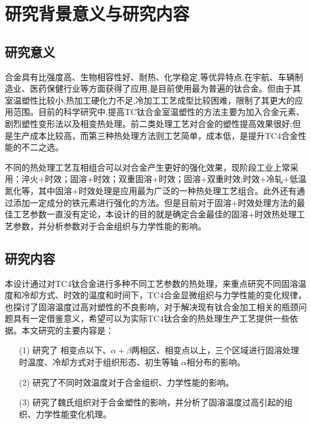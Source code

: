 \section{研究背景意义与研究内容}
\subsection{研究意义}
\ti 合金具有比强度高、生物相容性好、耐热、化学稳定,等优异特点,在宇航、车辆制造业、医药保健行业等方面获得了应用,是目前使用最为普遍的钛合金。但由于其室温塑性比较小,热加工硬化力不足,冷加工工艺成型比较困难，限制了其更大的应用范围。目前的科学研究中,提高TC钛合金室温塑性的方法主要为加入合金元素、剧烈塑性变形法以及相变热处理。前二类处理工艺对合金的塑性提高效果很好,但是生产成本比较高\cite{miao}，而第三种热处理方法则工艺简单，成本低，是提升TC4合金性能的不二之选。

不同的热处理工艺互相组合可以对合金产生更好的强化效果，现阶段工业上常采用\cite{zhoukaixiangJiyushenlengchulidenanjiagongcailiaoqiexiaotexingyanjiu2022}：淬火+时效；固溶+时效；双重固溶+时效；固溶+双重时效;时效+冷轧+低温氮化等，其中固溶+时效处理是应用最为广泛的一种热处理工艺组合。此外还有通过添加一定成分的铁元素进行强化的方法\cite{yuliaoMicrostructuralStrengtheningToughening2022}。但是目前对于固溶+时效处理方法的最佳工艺参数一直没有定论，本设计的目的就是确定\ti 合金最佳的固溶+时效热处理工艺参数，并分析参数对于合金组织与力学性能的影响。

\subsection{研究内容}
本设计通过对TC4钛合金进行多种不同工艺参数的热处理，来重点研究不同固溶温度和冷却方式、时效的温度和时间下，TC4合金显微组织与力学性能的变化规律，也探讨了固溶温度过高对塑性的不良影响，对于解决现有钛合金加工相关的瓶颈问题具有一定借鉴意义，希望可以为实际TC4钛合金的热处理生产工艺提供一些依据。本文研究的主要内容是：
\begin{enumerate}[itemindent=1em]
	\item[(1)] 研究了 相变点以下、$ \alpha+\beta $两相区、相变点以上，三个区域进行固溶处理时温度、冷却方式对于组织形态、初生等轴 $ \alpha $相分布的影响。
	\item[(2)] 研究了不同时效温度对于合金组织、力学性能的影响。
	\item[(3)] 研究了魏氏组织对于合金塑性的影响，并分析了固溶温度过高引起的组织、力学性能变化机理。
\end{enumerate}

